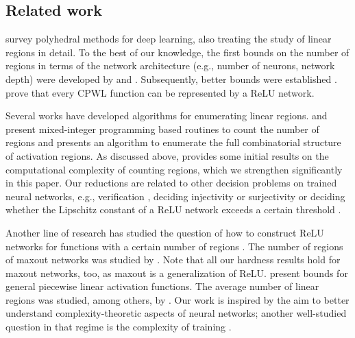\documentclass{article}
\begin{document}
\subsection{Related work}

\citet{huchette2023deep} survey polyhedral methods for deep learning, also treating the study of linear regions in detail. To the best of our knowledge, the first bounds on the number of regions in terms of the network architecture (e.g., number of neurons, network depth) were developed by \citet{pascanu2013number} and \citet{montufar2014number}. Subsequently, better bounds were established \citep{raghu2017expressive,arora2018understanding,serra2018bounding,zanotti2025bounds}. \citet{arora2018understanding} prove that every CPWL function can be represented by a ReLU network.

Several works have developed algorithms for enumerating linear regions.
\citet{serra2018bounding} and \citet{cai2023getting} present mixed-integer programming based routines to count the number of regions and \citet{masden2022algorithmic} presents an algorithm to enumerate the full combinatorial structure of activation regions. As discussed above, \citet{wang2022estimation} provides some initial results on the computational complexity of counting regions, which we strengthen significantly in this paper. Our reductions are related to other decision problems on trained neural networks, e.g., verification \citep{katz2017reluplex}, deciding injectivity or surjectivity \citep{froese2025parameterized,froese2024complexity} or deciding whether the Lipschitz constant of a ReLU network exceeds a certain threshold \citep{virmaux2018lipschitz,jordan2020exactly}.

Another line of research has studied the question of how to construct ReLU networks for functions with a certain number of regions \citep{he2018relu,chen2022improved,hertrich2023towards,brandenburg2025decomposition,zanotti2025linear}. The number of regions of maxout networks was studied by \citet{montufar2022sharp}. Note that all our hardness results hold for maxout networks, too, as maxout is a generalization of ReLU. \citet{goujon2024number} present bounds for general piecewise linear activation functions. The average number of linear regions was studied, among others, by \citet{hanin2019deep, tseran2021expected}. Our work is inspired by the aim to better understand complexity-theoretic aspects of neural networks; another well-studied question in that regime is the complexity of training \citep{goel2021tight,froese2022computational,froese2023training,bertschinger2023training}.
\end{document}
